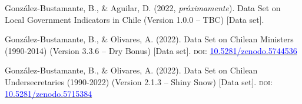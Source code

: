 





\begin{publications}

\begin{benumerate}{3}

\item{\small Gonz\'alez-Bustamante, B., \& Aguilar, D. (2022, {\itshape próximamente}). Data Set on Local Government Indicators in Chile (Version 1.0.0 -- TBC) [Data set].}\vspace{1mm}

\item{\small Gonz\'alez-Bustamante, B., \& Olivares, A. (2022). Data Set on Chilean Ministers (1990-2014) (Version 3.3.6 -- Dry Bonus) [Data set]. {\scshape doi:} \href{https://doi.org/10.5281/zenodo.5744536}{\textcolor{blue}{10.5281/zenodo.5744536}}}\vspace{1mm}

\item{Gonz\'alez-Bustamante, B., \& Olivares, A. (2022). Data Set on Chilean Undersecretaries (1990-2022) (Version 2.1.3 -- Shiny Snow) [Data set]. {\scshape doi:} \href{https://doi.org/10.5281/zenodo.5715384}{\textcolor{blue}{10.5281/zenodo.5715384}}}\vspace{1mm}

\end{benumerate}

\end{publications}
\pagebreak


